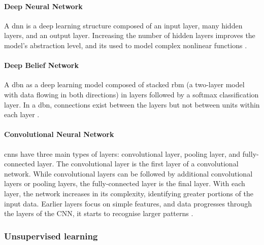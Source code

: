 \paragraph{Deep Neural Network}
A \gls{dnn} is a deep learning structure composed of an input layer, many hidden layers, and an output layer. Increasing the number of hidden layers improves the model's abstraction level, and its used to model complex nonlinear functions \cite{ahmad2021network}.

\paragraph{Deep Belief Network}
A \gls{dbn} as a deep learning model composed of stacked \gls{rbm} (a two-layer model with data flowing in both directions) in layers followed by a softmax classification layer. In a \gls{dbn}, connections exist between the layers but not between units within each layer \cite{ahmad2021network}.

\paragraph{Convolutional Neural Network}
\glspl{cnn} have three main types of layers: convolutional layer, pooling layer, and fully-connected layer. The convolutional layer is the first layer of a convolutional network. While convolutional layers can be followed by additional convolutional layers or pooling layers, the fully-connected layer is the final layer. With each layer, the network increases in its complexity, identifying greater portions of the input data. Earlier layers focus on simple features, and data progresses through the layers of the CNN, it starts to recognise larger patterns \cite{ibmCNN}.

\subsubsection{Unsupervised learning}

